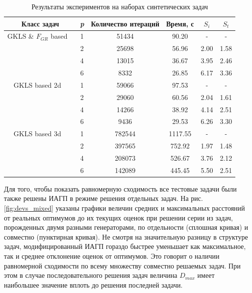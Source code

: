 \begin{table}
  \centering
  \caption{Результаты экспериментов на наборах синтетических задач}
  \label{tab:speedup}
  \begin{tabular}{c|c|cccc}
    Класс задач & \textit{p} & Количество итераций & Время, с & \(S_i\) & \(S_t\)   \\
    \hline
    GKLS \& \(F_{GR}\) based \
      & 1 & 51434 & 90.20 & -    & - \\
      & 2 & 25698 & 56.96 & 2.00 & 1.58 \\
      & 4 & 13015 & 36.67 & 3.95 & 2.46 \\
      & 6 & 8332  & 26.85 & 6.17 & 3.36 \\
    \hline
    GKLS based 2d \
      & 1 & 59066 & 97.53 & -    & - \\
      & 2 & 29060 & 60.56 & 2.04 & 1.61 \\
      & 4 & 14266 & 38.92 & 4.14 & 2.51 \\
      & 6 & 9436  & 29.53 & 6.26 & 3.30 \\
    \hline
    GKLS based 3d \
      & 1 & 782544 & 1117.55 & -    & - \\
      & 2 & 397565 & 752.92  & 1.97 & 1.48 \\
      & 4 & 208073 & 526.67  & 3.76 & 2.12 \\
      & 6 & 142089 & 445.45  & 5.50 & 2.51 \\
    \hline
  \end{tabular}
\end{table}

Для того, чтобы показать равномерную сходимость все тестовые задачи были также решены ИАГП
в режиме решения отдельных задач. На рис. \ref{fig:devs_mixed} указаны графики величин
средних и максимальных расстояний от реальных оптимумов до их текущих оценок при решении
серии из задач, порожденных двумя разными генераторами, по отдельности (сплошная кривая) и совместно (пунктирная кривая).
Не смотря на значительную разницу в структуре задач, модифицированный ИАГП
гораздо быстрее уменьшает как максимальное, так и среднее отклонение оценок от оптимумов.
Это говорит о наличии равномерной сходимости по всему множеству совместно решаемых задач.
При этом в случае последовательного решения задач величина \(D_{max}\) имеет наибольшее значение вплоть
до решения последней задачи.

